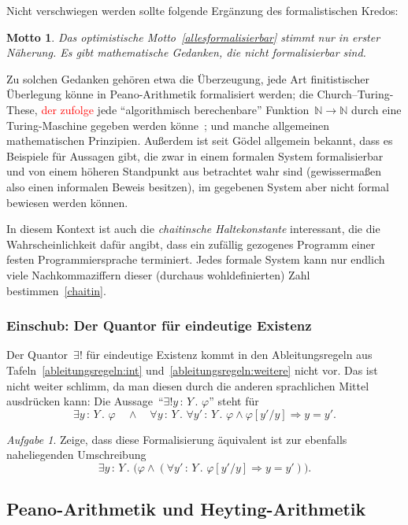 \documentclass[a4paper,ngerman,12pt]{scrartcl}
\theoremstyle{definition}
\theoremstyle{plain}
\newtheorem{motto}[defn]{Motto}
\theoremstyle{remark}
\newtheorem{aufg}[defn]{Aufgabe}
\newcommand{\NN}{\mathbb{N}}
\renewcommand{\_}{\mathpunct{.}\,}
\newcommand{\?}{\,{:}\,}
\newcommand{\XXX}[1]{\textcolor{red}{#1}}
\begin{document}
Nicht verschwiegen werden sollte folgende Ergänzung des formalistischen Kredos:
\begin{motto}Das optimistische Motto~\ref{allesformalisierbar} stimmt nur in
erster Näherung. Es gibt mathematische Gedanken, die nicht formalisierbar
sind.\end{motto}

Zu solchen Gedanken gehören etwa die Überzeugung, jede Art finitistischer
Über\-le\-gung könne in Peano-Arithmetik formalisiert werden; die
Church--Turing-These, \XXX{der zufolge} jede "`algorithmisch berechenbare"' Funktion~$\NN
\to \NN$ durch eine Turing-Maschine gegeben
werden könne~\cite{plato:ct,goldin:wegner:myth,church70}; und manche allgemeinen
mathematischen Prinzipien. Außerdem ist seit Gödel allgemein bekannt, dass es
Beispiele für Aussagen gibt, die zwar in einem formalen System formalisierbar und
von einem höheren Standpunkt aus betrachtet wahr sind (gewissermaßen also einen
informalen Beweis besitzen), im gegebenen System aber nicht formal bewiesen werden
können.

In diesem Kontext ist auch die \emph{chaitinsche Haltekonstante}
interessant, die die Wahrscheinlichkeit dafür angibt, dass ein zufällig
gezogenes Programm einer festen Programmiersprache terminiert. Jedes formale
System kann nur endlich viele Nachkommaziffern dieser (durchaus
wohldefinierten) Zahl bestimmen~\ref{chaitin}.


\subsubsection*{Einschub: Der Quantor für eindeutige Existenz}

Der Quantor~$\exists!$ für eindeutige Existenz kommt in den Ableitungsregeln aus
Tafeln~\ref{ableitungsregeln:int} und~\ref{ableitungsregeln:weitere} nicht vor.
Das ist nicht weiter schlimm, da man diesen durch die anderen sprachlichen
Mittel ausdrücken kann: Die Aussage~"`$\exists!y\?Y\_ \varphi$"' steht für
\[ \exists y\?Y\_ \varphi \quad\wedge\quad
  \forall y\?Y\_ \forall y'\?Y\_
  \varphi \wedge \varphi[y'/y] \Rightarrow y = y'. \]

\begin{aufg}Zeige, dass diese Formalisierung äquivalent ist zur ebenfalls
naheliegenden Umschreibung
\[ \exists y\?Y\_ \bigl(\varphi \wedge (\forall y'\?Y\_ \varphi[y'/y] \Rightarrow y =
y')\bigr). \]
\end{aufg}


\subsection{Peano-Arithmetik und Heyting-Arithmetik}
\end{document}
